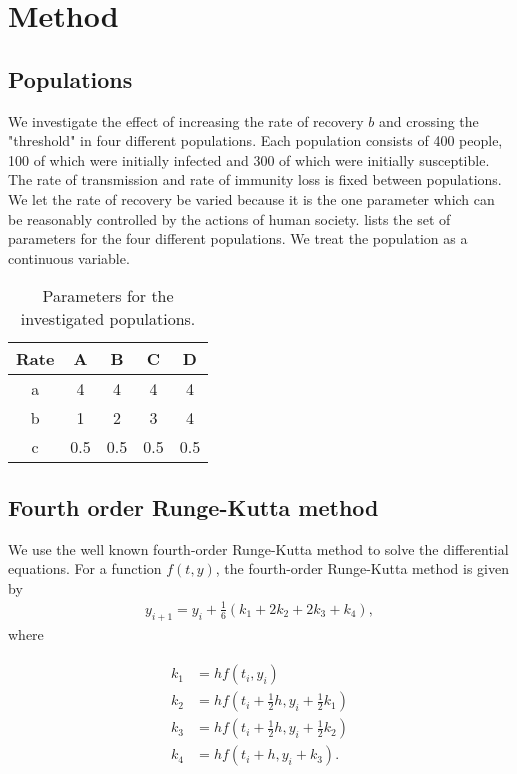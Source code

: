 \documentclass[../main.tex]{subfiles}
\begin{document}
\section{Method}\label{sec:method}
\subsection{Populations}\label{sec:populations}
We investigate the effect of increasing the rate of recovery $b$ and crossing the "threshold" in four different populations. Each population consists of 400 people, 100 of which were initially infected and 300 of which were initially susceptible. The rate of transmission and rate of immunity loss is fixed between populations. We let the rate of recovery be varied because it is the one parameter which can be reasonably controlled by the actions of human society.  lists the set of parameters for the four different populations. We treat the population as a continuous variable. 
\begin{table}[htb]
    \centering
    \caption{Parameters for the investigated populations.}
    \begin{tabular}{c c c c c}
    \toprule
    Rate & A & B & C & D \\
    \midrule
    a & 4 & 4 & 4 & 4 \\
    b & 1 & 2 & 3 & 4 \\
    c & 0.5 & 0.5 & 0.5 & 0.5 \\
    \bottomrule
    \end{tabular}
    \label{tab:parameters}
\end{table}

\subsection{Fourth order Runge-Kutta method}
We use the well known fourth-order Runge-Kutta method to solve the differential equations. For a function \ensuremath{f(t, y)}, the fourth-order Runge-Kutta method is given by
\begin{align}
    y_{i+1}=y_i+\frac{1}{6}(k_1+2k_2+2k_3+k_4), 
    \label{eq:rk4}
\end{align} where

\begin{align}
    \begin{split}
        k_1&=hf(t_i, y_i) \\
        k_2&=hf(t_i+\frac{1}{2}h, y_i+\frac{1}{2}k_1) \\
        k_3&=hf(t_i+\frac{1}{2}h, y_i+\frac{1}{2}k_2)\\
        k_4&=hf(t_i+h, y_i+k_3).
    \end{split}
\end{align}
\end{document}
